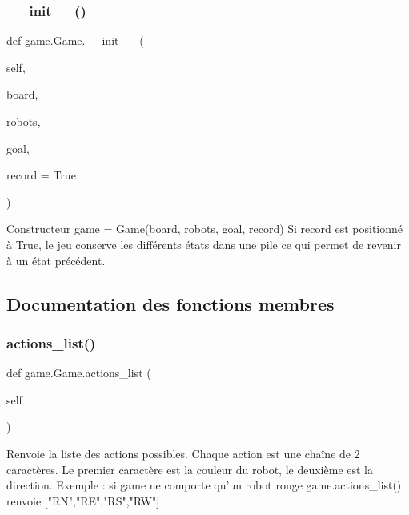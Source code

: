 \subsubsection{\texorpdfstring{\+\_\+\+\_\+init\+\_\+\+\_\+()}{\_\_init\_\_()}}
{\footnotesize\ttfamily def game.\+Game.\+\_\+\+\_\+init\+\_\+\+\_\+ (\begin{DoxyParamCaption}\item[{}]{self,  }\item[{}]{board,  }\item[{}]{robots,  }\item[{}]{goal,  }\item[{}]{record = {\ttfamily True} }\end{DoxyParamCaption})}

\begin{DoxyVerb}Constructeur
game = Game(board, robots, goal, record)
Si record est positionné à True, le jeu conserve les différents états dans une pile
ce qui permet de revenir à un état précédent.
\end{DoxyVerb}
 

\subsection{Documentation des fonctions membres}
\mbox{\label{classgame_1_1Game_a485f03c6330c2bb3284638de65b6cae0}} 
\subsubsection{\texorpdfstring{actions\+\_\+list()}{actions\_list()}}
{\footnotesize\ttfamily def game.\+Game.\+actions\+\_\+list (\begin{DoxyParamCaption}\item[{}]{self }\end{DoxyParamCaption})}

\begin{DoxyVerb}Renvoie la liste des actions possibles.
Chaque action est une chaîne de 2 caractères.
Le premier caractère est la couleur du robot, le deuxième est la direction.
Exemple : si game ne comporte qu'un robot rouge
game.actions_list() renvoie ["RN","RE","RS","RW"]
\end{DoxyVerb}
 \mbox{\label{classgame_1_1Game_a2ccf23306726654420eec1a50f67d1cb}} 
